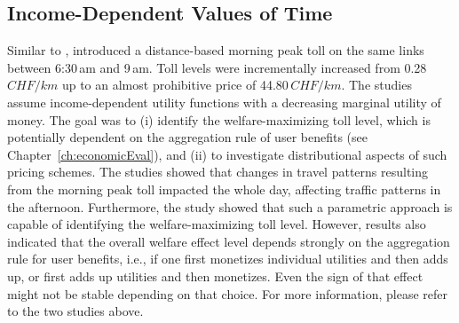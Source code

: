 \subsection{Income-Dependent Values of Time}
Similar to \citet{RieserEtAl_TRBTDF_2008}, \citet{KickhoeferEtAl2010EconomicEvaluationPublicAcceptanceRoadPricingKuhmo, Kickhoefer_PhDThesis_2014} introduced a distance-based morning peak toll on the same links between 6:30\,am and 9\,am. Toll levels were incrementally increased from 0.28\,$CHF/km$ up to an almost prohibitive price of 44.80\,$CHF/km$. The studies assume income-dependent utility functions with a decreasing marginal utility of money. The goal was to (i) identify the welfare-maximizing \citep[see e.g.,][Section~2.5]{TirachiniEtAl2012CrowdingCongestion}
toll level, which is potentially dependent on the aggregation rule of user benefits (see Chapter~\ref{ch:economicEval}), and (ii) to investigate distributional aspects of such pricing schemes.
%
The studies showed that changes in travel patterns resulting from the morning peak toll impacted the whole day, affecting traffic patterns in the afternoon.
%
Furthermore, the study showed that such a parametric approach is capable of identifying the welfare-maximizing toll level. However, results also indicated that the overall welfare effect level depends strongly on the aggregation rule for user benefits, i.e., if one first monetizes individual utilities and then adds up, or first adds up utilities and then monetizes. 
Even the sign of that effect might not be stable depending on that choice.
%
For more information, please refer to the two studies above.


